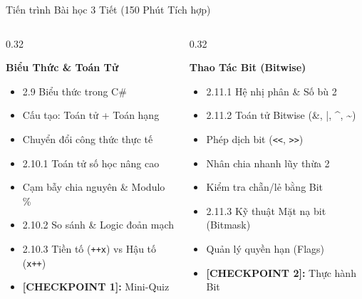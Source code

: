 \documentclass[aspectratio=169, 10pt]{beamer}
\begin{document}
\begin{frame}{Tiến trình Bài học 3 Tiết (150 Phút Tích hợp)}
  \begin{columns}[T]
    \begin{column}{0.32\textwidth}
      \begin{tcolorbox}[colback=UniNavy!5,colframe=UniNavy,title=\textbf{TIẾT 1 (50')},fonttitle=\small\bfseries]
        \textbf{Biểu Thức \& Toán Tử}
        \begin{itemize}\scriptsize
          \item 2.9 Biểu thức trong C\#
          \item Cấu tạo: Toán tử + Toán hạng
          \item Chuyển đổi công thức thực tế
          \item 2.10.1 Toán tử số học nâng cao
          \item Cạm bẫy chia nguyên \& Modulo \%
          \item 2.10.2 So sánh \& Logic đoản mạch
          \item 2.10.3 Tiền tố (\texttt{++x}) vs Hậu tố (\texttt{x++})
          \item \textbf{[CHECKPOINT 1]:} Mini-Quiz
        \end{itemize}
      \end{tcolorbox}
    \end{column}

    \begin{column}{0.32\textwidth}
      \begin{tcolorbox}[colback=CSharpPurple!5,colframe=CSharpPurple,title=\textbf{TIẾT 2 (50')},fonttitle=\small\bfseries]
        \textbf{Thao Tác Bit (Bitwise)}
        \begin{itemize}\scriptsize
          \item 2.11.1 Hệ nhị phân \& Số bù 2
          \item 2.11.2 Toán tử Bitwise (\&, |, \textasciicircum, \textasciitilde)
          \item Phép dịch bit (\texttt{<<}, \texttt{>>})
          \item Nhân chia nhanh lũy thừa 2
          \item Kiểm tra chẵn/lẻ bằng Bit
          \item 2.11.3 Kỹ thuật Mặt nạ bit (Bitmask)
          \item Quản lý quyền hạn (Flags)
          \item \textbf{[CHECKPOINT 2]:} Thực hành Bit
        \end{itemize}
      \end{tcolorbox}
    \end{column}


\end{columns}
\end{frame}
\end{document}
